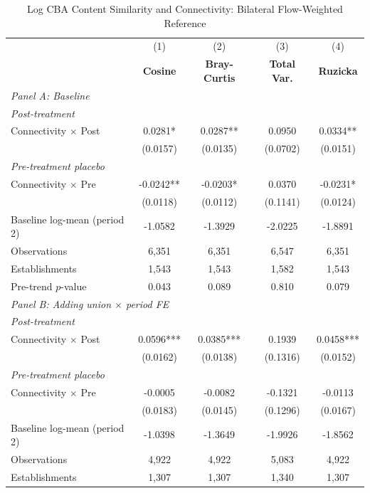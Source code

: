 \begin{table}[H]
\centering
\caption{Log CBA Content Similarity and Connectivity: Bilateral Flow-Weighted Reference}
\scriptsize
\setlength{\tabcolsep}{8pt}
\begin{tabular}{lcccc}
\hline\hline
 & (1) & (2) & (3) & (4) \\
 & \textbf{Cosine} & \textbf{Bray-Curtis} & \textbf{Total Var.} & \textbf{Ruzicka} \\
\hline
\multicolumn{5}{l}{\textit{Panel A: Baseline}} \\
\multicolumn{5}{l}{\textit{Post-treatment}} \\
Connectivity $\times$ Post & 0.0281* & 0.0287** & 0.0950 & 0.0334** \\
 & (0.0157) & (0.0135) & (0.0702) & (0.0151) \\
\multicolumn{5}{l}{\textit{Pre-treatment placebo}} \\
Connectivity $\times$ Pre & -0.0242** & -0.0203* & 0.0370 & -0.0231* \\
 & (0.0118) & (0.0112) & (0.1141) & (0.0124) \\
\hline
Baseline log-mean (period 2) & -1.0582 & -1.3929 & -2.0225 & -1.8891 \\
Observations &        6,351 &        6,351 &        6,547 &        6,351 \\
Establishments &        1,543 &        1,543 &        1,582 &        1,543 \\
Pre-trend $p$-value & 0.043 & 0.089 & 0.810 & 0.079 \\
\hline
\multicolumn{5}{l}{\textit{Panel B: Adding union $\times$ period FE}} \\
\multicolumn{5}{l}{\textit{Post-treatment}} \\
Connectivity $\times$ Post & 0.0596*** & 0.0385*** & 0.1939 & 0.0458*** \\
 & (0.0162) & (0.0138) & (0.1316) & (0.0152) \\
\multicolumn{5}{l}{\textit{Pre-treatment placebo}} \\
Connectivity $\times$ Pre & -0.0005 & -0.0082 & -0.1321 & -0.0113 \\
 & (0.0183) & (0.0145) & (0.1296) & (0.0167) \\
\hline
Baseline log-mean (period 2) & -1.0398 & -1.3649 & -1.9926 & -1.8562 \\
Observations &        4,922 &        4,922 &        5,083 &        4,922 \\
Establishments &        1,307 &        1,307 &        1,340 &        1,307 \\

\end{tabular}
\end{table}
